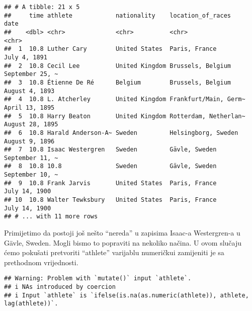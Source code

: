 \documentclass[
]{article}
\newenvironment{Shaded}{\begin{snugshade}}{\end{snugshade}}
\newcommand{\CommentTok}[1]{\textcolor[rgb]{0.56,0.35,0.01}{\textit{#1}}}
\newcommand{\DataTypeTok}[1]{\textcolor[rgb]{0.13,0.29,0.53}{#1}}
\newcommand{\KeywordTok}[1]{\textcolor[rgb]{0.13,0.29,0.53}{\textbf{#1}}}
\newcommand{\NormalTok}[1]{#1}
\newcommand{\OperatorTok}[1]{\textcolor[rgb]{0.81,0.36,0.00}{\textbf{#1}}}
\newcommand{\StringTok}[1]{\textcolor[rgb]{0.31,0.60,0.02}{#1}}
\begin{document}
\begin{Shaded}
\end{Shaded}

\begin{verbatim}
## # A tibble: 21 x 5
##     time athlete            nationality    location_of_races     date           
##    <dbl> <chr>              <chr>          <chr>                 <chr>          
##  1  10.8 Luther Cary        United States  Paris, France         July 4, 1891   
##  2  10.8 Cecil Lee          United Kingdom Brussels, Belgium     September 25, ~
##  3  10.8 Étienne De Ré      Belgium        Brussels, Belgium     August 4, 1893 
##  4  10.8 L. Atcherley       United Kingdom Frankfurt/Main, Germ~ April 13, 1895 
##  5  10.8 Harry Beaton       United Kingdom Rotterdam, Netherlan~ August 28, 1895
##  6  10.8 Harald Anderson-A~ Sweden         Helsingborg, Sweden   August 9, 1896 
##  7  10.8 Isaac Westergren   Sweden         Gävle, Sweden         September 11, ~
##  8  10.8 10.8               Sweden         Gävle, Sweden         September 10, ~
##  9  10.8 Frank Jarvis       United States  Paris, France         July 14, 1900  
## 10  10.8 Walter Tewksbury   United States  Paris, France         July 14, 1900  
## # ... with 11 more rows
\end{verbatim}

Primijetimo da postoji još nešto ``nereda'' u zapisima Isaac-a
Westergren-a u Gävle, Sweden. Mogli bismo to popraviti na nekoliko
načina. U ovom slučaju ćemo pokušati pretvoriti ``athlete'' varijablu
numeričkui zamijeniti je sa prethodnom vrijednosti.

\begin{Shaded}
\end{Shaded}

\begin{verbatim}
## Warning: Problem with `mutate()` input `athlete`.
## i NAs introduced by coercion
## i Input `athlete` is `ifelse(is.na(as.numeric(athlete)), athlete, lag(athlete))`.
\end{verbatim}
\end{document}
